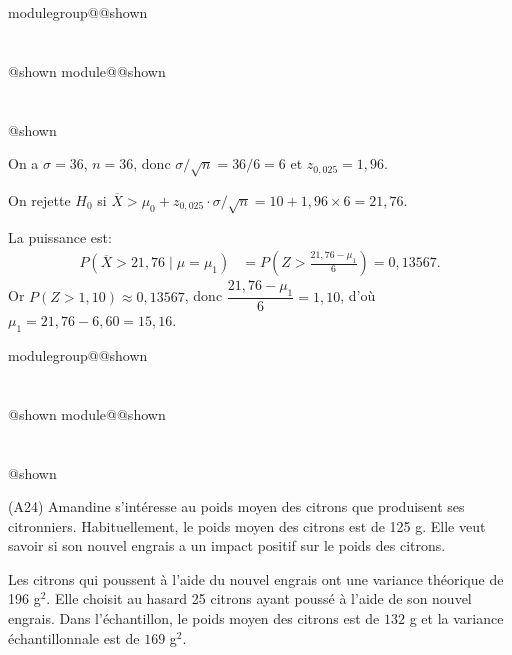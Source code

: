 \documentclass{Evaluation}
\makeatletter
\newcommand{\currentmodulekey}{}
\newcommand{\currentmoduletitle}{}
\newcommand{\currentgroupkey}{}
\newcommand{\currentgrouptitle}{}
\newcommand{\showmoduleifneeded}{%
  \ifx\currentgroupkey\empty\else
    \expandafter\ifx\csname modulegroup@\currentgroupkey @shown\endcsname\relax
      \section*{\currentgrouptitle}%
      \expandafter\gdef\csname modulegroup@\currentgroupkey @shown\endcsname{1}%
    \fi
  \fi
  \expandafter\ifx\csname module@\currentmodulekey @shown\endcsname\relax
    \section*{\currentmoduletitle}%
    \expandafter\gdef\csname module@\currentmodulekey @shown\endcsname{1}%
  \fi
}
\newenvironment{H24}{\showmoduleifneeded}{}
\newenvironment{A24}{\showmoduleifneeded}{}
\makeatother
\begin{document}
\begin{questions}
\begin{H24}
\begin{solution}
On a $\sigma = 36$, $n = 36$, donc $\sigma/\sqrt{n} = 36/6 = 6$ et $z_{0{,}025} = 1{,}96$.

On rejette $H_0$ si $\overline{X} > \mu_0 + z_{0{,}025} \cdot \sigma/\sqrt{n} = 10 + 1{,}96 \times 6 = 21{,}76$.

La puissance est:
\begin{align*}
P(\overline{X} > 21{,}76 \mid \mu = \mu_1) &= P\!\left(Z > \frac{21{,}76 - \mu_1}{6}\right) = 0{,}13567.
\end{align*}
Or $P(Z > 1{,}10) \approx 0{,}13567$, donc $\dfrac{21{,}76 - \mu_1}{6} = 1{,}10$, d'où $\mu_1 = 21{,}76 - 6{,}60 = 15{,}16$.
\end{solution}
\end{H24}

\begin{A24}
\question (A24)
Amandine s'intéresse au poids moyen des citrons que produisent ses citronniers. Habituellement, le poids moyen des citrons est de 125 g. 
Elle veut savoir si son nouvel engrais a un impact positif sur le poids des citrons.

Les citrons qui poussent à l'aide du nouvel engrais ont une variance théorique de 196 g$^2$. Elle choisit au hasard 25 citrons ayant poussé à l'aide de son nouvel engrais.
Dans l'échantillon, le poids moyen des citrons est de $132$ g et la variance échantillonnale est de $169$ g$^2$.

\end{A24}
\end{questions}
\end{document}
